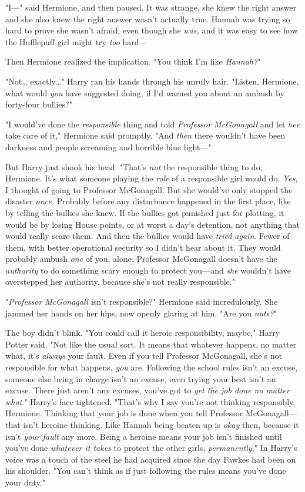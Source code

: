 "I---" said Hermione, and then paused. It was strange, she knew the right
answer and she also knew the right answer wasn't actually true. Hannah was
trying so hard to prove she wasn't afraid, even though she \emph{was,} and it
was easy to see how the Hufflepuff girl might try \emph{too} hard---

Then Hermione realized the implication. "You think I'm like \emph{Hannah?}"

"Not{\ldots} exactly{\ldots}" Harry ran his hands through his unruly hair.
"Listen, Hermione, what would \emph{you} have suggested doing, if I'd warned
you about an ambush by forty-four bullies?"

"I would've done the \emph{responsible} thing and told \emph{Professor
McGonagall} and let \emph{her} take care of it," Hermione said promptly. "And
\emph{then} there wouldn't have been darkness and people screaming and horrible
blue light---"

But Harry just shook his head. "That's \emph{not} the responsible thing to do,
Hermione. It's what someone playing the \emph{role} of a responsible girl would
do. \emph{Yes}, I thought of going to Professor McGonagall. But she would've
only stopped the disaster \emph{once.} Probably before any disturbance happened
in the first place, like by telling the bullies she knew. If the bullies got
punished just for plotting, it would be by losing House points, or at worst a
day's detention, not anything that would really scare them. And then the
bullies would have \emph{tried again}. Fewer of them, with better operational
security so I didn't hear about it. They would probably ambush \emph{one} of
you, alone. Professor McGonagall doesn't have the \emph{authority} to do
something scary enough to protect you---and \emph{she} wouldn't have
overstepped her authority, because she's not really responsible."

"\emph{Professor McGonagall} isn't responsible?" Hermione said incredulously.
She jammed her hands on her hips, now openly glaring at him. "Are you
\emph{nuts?}"

The boy didn't blink. "You could call it heroic responsibility, maybe," Harry
Potter said. "Not like the usual sort. It means that whatever happens, no
matter what, it's \emph{always} your fault. Even if you tell Professor
McGonagall, she's not responsible for what happens, \emph{you} are. Following
the school rules isn't an excuse, someone else being in charge isn't an excuse,
even trying your best isn't an excuse. There just aren't any excuses, you've
got to \emph{get the job done no matter what}." Harry's face tightened. "That's
why I say you're not thinking responsibly, Hermione. Thinking that your job is
done when you tell Professor McGonagall---that isn't heroine thinking. Like
Hannah being beaten up is \emph{okay} then, because it isn't \emph{your fault}
any more. Being a heroine means your job isn't finished until you've done
\emph{whatever it takes} to protect the other girls, \emph{permanently.}" In Harry's
voice was a touch of the steel he had acquired since the day Fawkes had been on
his shoulder. "You can't think as if just following the rules means you've done
your duty."

